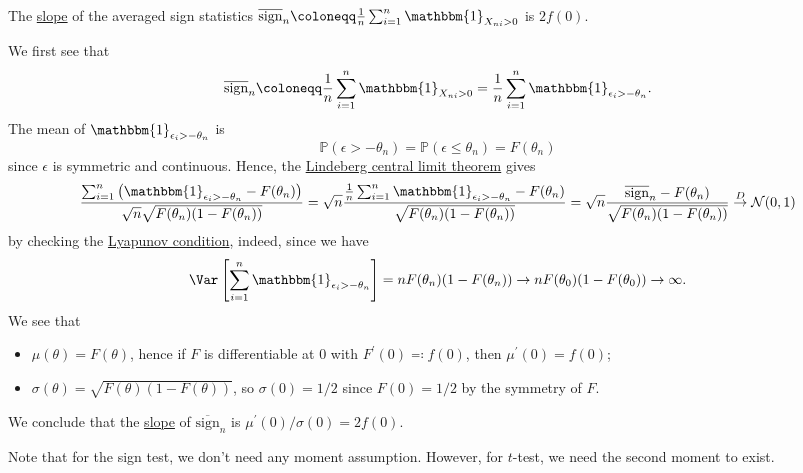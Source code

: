 \begin{eg}
	The \hyperref[def:slope]{slope} of the averaged sign statistics \(\overline{\mathrm{sign}} _n \coloneqq \frac{1}{n} \sum_{i=1}^{n} \mathbbm{1}_{X_{ni} > 0} \) is \(2 f(0)\).
\end{eg}
\begin{explanation}
	We first see that
	\[
		\overline{\mathrm{sign}} _n
		\coloneqq \frac{1}{n} \sum_{i=1}^{n} \mathbbm{1}_{X_{ni} > 0}
		= \frac{1}{n} \sum_{i=1}^{n} \mathbbm{1}_{\epsilon _i > - \theta _n}.
	\]
	The mean of \(\mathbbm{1}_{\epsilon _i > -\theta _n} \) is
	\[
		\mathbb{P} (\epsilon > -\theta _n)
		= \mathbb{P} (\epsilon \leq \theta _n)
		= F(\theta _n)
	\]
	since \(\epsilon \) is symmetric and continuous. Hence, the \hyperref[thm:Lindeberg-CLT]{Lindeberg central limit theorem} gives
	\[
		\frac{\sum_{i=1}^{n} \left( \mathbbm{1}_{\epsilon _i  > -\theta _n} - F(\theta _n) \right) }{\sqrt{n} \sqrt{F(\theta _n) (1 - F(\theta _n))} }
		= \sqrt{n} \frac{\frac{1}{n} \sum_{i=1}^{n} \mathbbm{1}_{\epsilon _i > -\theta _n} - F(\theta _n) }{\sqrt{F(\theta _n) (1 - F(\theta _n)) } }
		= \sqrt{n} \frac{\overline{\mathrm{sign}} _n - F(\theta _n) }{\sqrt{F(\theta _n) (1 - F(\theta _n)) } }
		\overset{D}{\to} \mathcal{N} (0, 1)
	\]
	by checking the \hyperref[col:Lyapunov-CLT]{Lyapunov condition}, indeed, since we have
	\[
		\Var_{}\left[\sum_{i=1}^{n} \mathbbm{1}_{\epsilon _i > -\theta _n} \right]
		= n F(\theta _n) (1 - F(\theta _n))
		\to n F(\theta _0) (1 - F(\theta _0))
		\to \infty.
	\]
	We see that
	\begin{itemize}
		\item \(\mu (\theta ) = F(\theta ) \), hence if \(F\) is differentiable at \(0\) with \(F^{\prime} (0) \eqqcolon f(0)\), then \(\mu ^{\prime} (0) = f(0)\);
		\item \(\sigma (\theta ) = \sqrt{F(\theta )(1 - F(\theta ))} \), so \(\sigma (0) = 1 / 2\) since \(F(0) = 1 / 2\) by the symmetry of \(F\).
	\end{itemize}
	We conclude that the \hyperref[def:slope]{slope} of \(\overline{\mathrm{sign}} _n\) is \(\mu ^{\prime} (0) / \sigma (0) = 2f(0)\).
\end{explanation}

Note that for the sign test, we don't need any moment assumption. However, for \(t\)-test, we need the second moment to exist.

